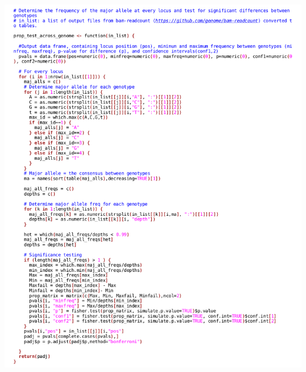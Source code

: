 \documentclass[12pt,twoside]{reedthesis}
\begin{document}
\includegraphics[width=1\textwidth]{../appendix_code/allele_freq_shifts.png}
\backmatter %


\renewcommand{\bibname}{Works Cited}

%

\end{document}

